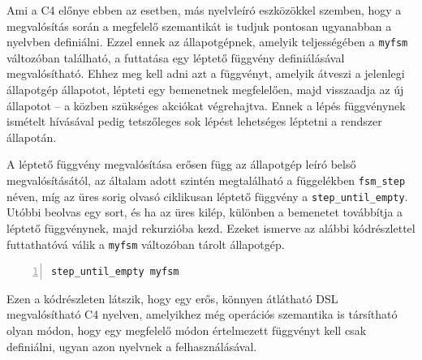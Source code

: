Ami a C4 előnye ebben az esetben, más nyelvleíró eszközökkel szemben, hogy a megvalósítás során a megfelelő szemantikát is tudjuk pontosan ugyanabban a nyelvben definiálni.
Ezzel ennek az állapotgépnek, amelyik teljességében a {\tt myfsm} változóban található, a futtatása egy léptető függvény definiálásával megvalósítható. 
Ehhez meg kell adni azt a függvényt, amelyik átveszi a jelenlegi állapotgép állapotot, lépteti egy bemenetnek megfelelően, majd visszaadja az új állapotot -- a közben szükséges akciókat végrehajtva.
Ennek a lépés függvénynek ismételt hívásával pedig tetszőleges sok lépést lehetséges léptetni a rendszer állapotán.

A léptető függvény megvalósítása erősen függ az állapotgép leíró belső megvalósításától, az általam adott szintén megtalálható a függelékben {\tt fsm\_step} néven, míg az üres sorig olvasó ciklikusan léptető függvény a {\tt step\_until\_empty}.
Utóbbi beolvas egy sort, és ha az üres kilép, különben a bemenetet továbbítja a léptető függvénynek, majd rekurzióba kezd.
Ezeket ismerve az alábbi kódrészlettel futtathatóvá válik a {\tt myfsm} változóban tárolt állapotgép.

\begin{lstlisting}[gobble=2,numbers=left]
	step_until_empty myfsm
\end{lstlisting}

Ezen a kódrészleten látszik, hogy egy erős, könnyen átlátható \gls{DSL} megvalósítható C4 nyelven, amelyikhez még operációs szemantika is társítható olyan módon, hogy egy megfelelő módon értelmezett függvényt kell csak definiálni, ugyan azon nyelvnek a felhasználásával.


























